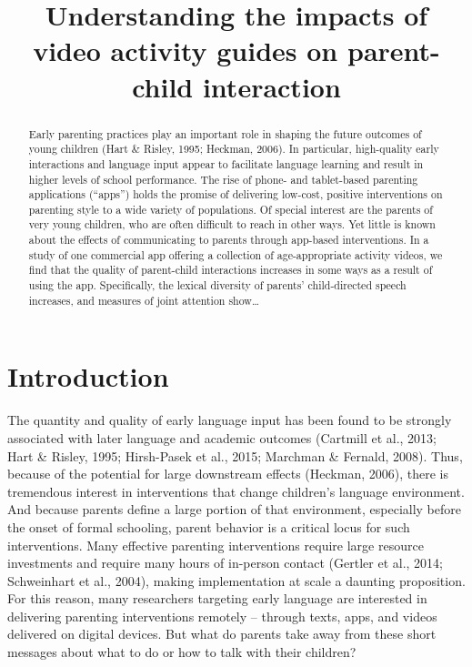 \documentclass[]{article}
\title{Understanding the impacts of video activity guides on parent-child
interaction}
\author{}
\date{}
\begin{document}
\maketitle
\begin{abstract}
Early parenting practices play an important role in shaping the future
outcomes of young children (Hart \& Risley, 1995; Heckman, 2006). In
particular, high-quality early interactions and language input appear to
facilitate language learning and result in higher levels of school
performance. The rise of phone- and tablet-based parenting applications
(``apps'') holds the promise of delivering low-cost, positive
interventions on parenting style to a wide variety of populations. Of
special interest are the parents of very young children, who are often
difficult to reach in other ways. Yet little is known about the effects
of communicating to parents through app-based interventions. In a study
of one commercial app offering a collection of age-appropriate activity
videos, we find that the quality of parent-child interactions increases
in some ways as a result of using the app. Specifically, the lexical
diversity of parents' child-directed speech increases, and measures of
joint attention show\ldots{}
\end{abstract}

\hypertarget{introduction}{%
\section{Introduction}\label{introduction}}

The quantity and quality of early language input has been found to be
strongly associated with later language and academic outcomes (Cartmill
et al., 2013; Hart \& Risley, 1995; Hirsh-Pasek et al., 2015; Marchman
\& Fernald, 2008). Thus, because of the potential for large downstream
effects (Heckman, 2006), there is tremendous interest in interventions
that change children's language environment. And because parents define
a large portion of that environment, especially before the onset of
formal schooling, parent behavior is a critical locus for such
interventions. Many effective parenting interventions require large
resource investments and require many hours of in-person contact
(Gertler et al., 2014; Schweinhart et al., 2004), making implementation
at scale a daunting proposition. For this reason, many researchers
targeting early language are interested in delivering parenting
interventions remotely -- through texts, apps, and videos delivered on
digital devices. But what do parents take away from these short messages
about what to do or how to talk with their children?
\end{document}
